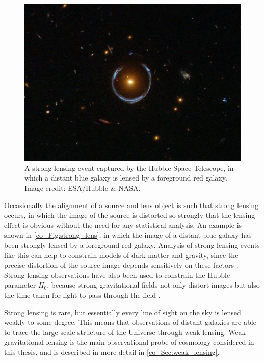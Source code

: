 \begin{figure}
\includegraphics[width=\textwidth]{strong_lens}
\caption{A strong lensing event captured by the Hubble Space Telescope, in which a distant blue galaxy is lensed by a foreground red galaxy. Image credit: ESA/Hubble \& NASA.}
\label{co_Fig:strong_lens}
\end{figure}

Occasionally the alignment of a source and lens object is such that strong lensing occurs, in which the image of the source is distorted so strongly that the lensing effect is obvious without the need for any statistical analysis. An example is shown in \autoref{co_Fig:strong_lens}, in which the image of a distant blue galaxy has been strongly lensed by a foreground red galaxy. Analysis of strong lensing events like this can help to constrain models of dark matter and gravity, since the precise distortion of the source image depends sensitively on these factors \citep[e.g.][]{Vegetti2014, Li2016, Hezaveh2016, Gilman2020, Andrade2022}. Strong lensing observations have also been used to constrain the Hubble parameter $H_0$, because strong gravitational fields not only distort images but also the time taken for light to pass through the field \citep[e.g.][]{Bonvin2017}.

Strong lensing is rare, but essentially every line of sight on the sky is lensed weakly to some degree. This means that observations of distant galaxies are able to trace the large scale structure of the Universe through weak lensing. Weak gravitational lensing is the main observational probe of cosmology considered in this thesis, and is described in more detail in \autoref{co_Sec:weak_lensing}.

